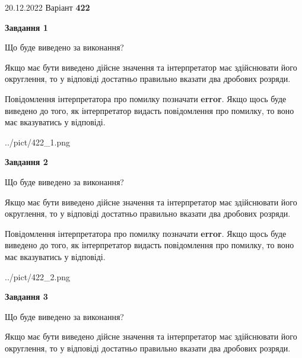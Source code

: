 \documentclass[12pt, ukrainian]{article}
\begin{document}
{20.12.2022 Варіант \No \textbf { 422 }\par}
{
\begin {Large}

{\begin {center}\textbf{Завдання 1}\end {center}}\par
Що буде виведено за виконання? \par

Якщо має бути виведено дійсне значення та інтерпретатор має здійснювати його округлення, 
то у відповіді достатньо правильно вказати два дробових розряди.

Повідомлення інтерпретатора про помилку позначати \textbf{error}.
Якщо щось буде виведено до того, як інтерпретатор видасть повідомлення про помилку, 
то воно має вказуватись у відповіді. \par

\begin{center}
	{../pict/422_1.png}
\end{center}
\newpage

{\begin {center}\textbf{Завдання 2}\end {center}}\par
Що буде виведено за виконання? \par

Якщо має бути виведено дійсне значення та інтерпретатор має здійснювати його округлення, 
то у відповіді достатньо правильно вказати два дробових розряди.

Повідомлення інтерпретатора про помилку позначати \textbf{error}.
Якщо щось буде виведено до того, як інтерпретатор видасть повідомлення про помилку, 
то воно має вказуватись у відповіді. \par

\begin{center}
	{../pict/422_2.png}
\end{center}
\newpage

{\begin {center}\textbf{Завдання 3}\end {center}}\par
Що буде виведено за виконання? \par

Якщо має бути виведено дійсне значення та інтерпретатор має здійснювати його округлення, 
то у відповіді достатньо правильно вказати два дробових розряди.


\end{Large}}
\end{document}
